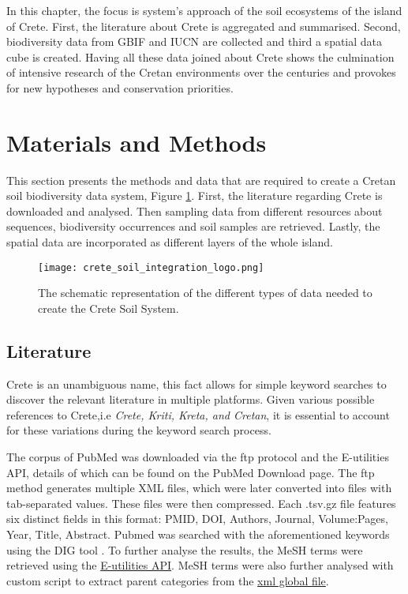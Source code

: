 In this chapter, the focus is system's approach of the soil ecosystems of the island of Crete.
First, the literature about Crete is aggregated and summarised. Second, biodiversity data
from GBIF and IUCN \parencite{iucn2024} are collected and third a spatial data cube is created. 
Having all these data joined about Crete shows the culmination of intensive 
research of the Cretan environments over the centuries and provokes for new
hypotheses and conservation priorities.


\section{Materials and Methods}\label{integration_methods}

This section presents the methods and data that are required to create
a Cretan soil biodiversity data system, Figure \ref{fig:crete_soil_logo}. First, the literature regarding 
Crete is downloaded and analysed. Then sampling data from different 
resources about sequences, biodiversity occurrences and soil samples 
are retrieved. Lastly, the spatial data are incorporated as different 
layers of the whole island.

\begin{figure}[hbt!] 
    \centering\texttt{[image: crete\_soil\_integration\_logo.png]}
    \caption{The schematic representation of the different types of data needed to create the Crete Soil System.}
    \label{fig:crete_soil_logo}
\end{figure}

\subsection{Literature}\label{crete-literature}

Crete is an unambiguous name, this fact allows for simple keyword searches to discover 
the relevant literature in multiple platforms. Given various possible references to Crete,i.e \textit{Crete, Kriti, Kreta, and Cretan},
it is essential to account for these variations during the keyword search process.

The corpus of PubMed was downloaded via the ftp protocol and the E-utilities API, details of which can be found on the PubMed Download page.
The ftp method generates multiple XML files, which were later converted into
files with tab-separated values. These files were then compressed. Each .tsv.gz file
features six distinct fields in this format: PMID, DOI, Authors, Journal, Volume:Pages, Year, Title, Abstract.
Pubmed was searched with the aforementioned keywords using the DIG tool \parencite{fanini2021coupling}. To further 
analyse the results, the MeSH terms were retrieved using the \href{https://www.ncbi.nlm.nih.gov/books/NBK25497/}{E-utilities API}.
MeSH terms were also further analysed with custom script to extract 
parent categories from the \href{https://www.nlm.nih.gov/databases/download/mesh.html}{xml global file}.

